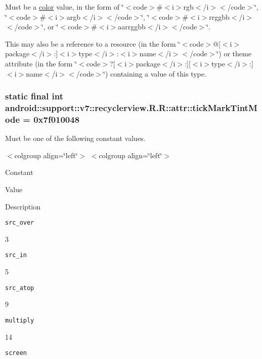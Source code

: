 Must be a \hyperlink{classandroid_1_1support_1_1v7_1_1recyclerview_1_1_r_1_1color}{color} value, in the form of \char`\"{}$<$code$>$\#$<$i$>$rgb$<$/i$>$$<$/code$>$\char`\"{}, \char`\"{}$<$code$>$\#$<$i$>$argb$<$/i$>$$<$/code$>$\char`\"{}, \char`\"{}$<$code$>$\#$<$i$>$rrggbb$<$/i$>$$<$/code$>$\char`\"{}, or \char`\"{}$<$code$>$\#$<$i$>$aarrggbb$<$/i$>$$<$/code$>$\char`\"{}. 

This may also be a reference to a resource (in the form \char`\"{}$<$code$>$@\mbox{[}$<$i$>$package$<$/i$>$:\mbox{]}$<$i$>$type$<$/i$>$:$<$i$>$name$<$/i$>$$<$/code$>$\char`\"{}) or theme attribute (in the form \char`\"{}$<$code$>$?\mbox{[}$<$i$>$package$<$/i$>$:\mbox{]}\mbox{[}$<$i$>$type$<$/i$>$:\mbox{]}$<$i$>$name$<$/i$>$$<$/code$>$\char`\"{}) containing a value of this type. \hypertarget{classandroid_1_1support_1_1v7_1_1recyclerview_1_1_r_1_1attr_c7e25be131a610e1b781e35b914915f1}{
\subsubsection[{tickMarkTintMode}]{\setlength{\rightskip}{0pt plus 5cm}static final int android::support::v7::recyclerview.R.R::attr::tickMarkTintMode = 0x7f010048}}
\label{classandroid_1_1support_1_1v7_1_1recyclerview_1_1_r_1_1attr_c7e25be131a610e1b781e35b914915f1}


Must be one of the following constant values. \begin{TabularC}{0}
\hline
\end{TabularC}
$<$colgroup align=\char`\"{}left\char`\"{}$>$ $<$colgroup align=\char`\"{}left\char`\"{}$>$ 

Constant

Value

Description 

{\tt src\_\-over}

3

{\tt src\_\-in}

5

{\tt src\_\-atop}

9

{\tt multiply}

14

{\tt screen}

